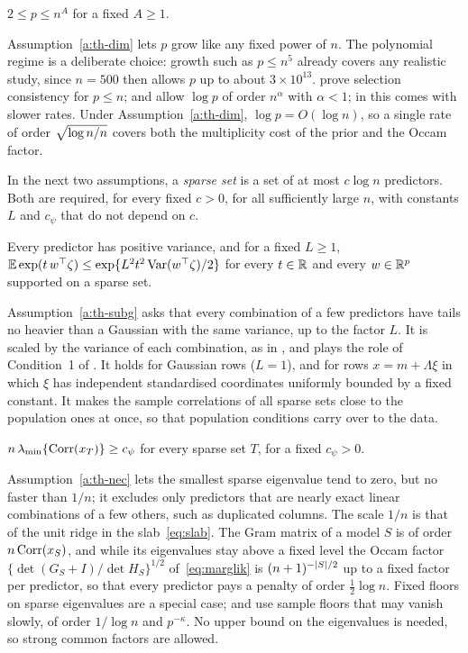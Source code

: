 \begin{assumption}[Dimension]\label{a:th-dim}
$2\le p\le n^A$ for a fixed $A\ge1$.
\end{assumption}

Assumption~\ref{a:th-dim} lets $p$ grow like any fixed power of $n$. The polynomial regime is a deliberate choice:
growth such as $p\le n^5$ already covers any realistic study, since $n=500$ then allows $p$ up to about $3\times10^{13}$.
\citet{JohnsonRossell2012} prove selection
consistency for $p\le n$; \citet{SongLiang2015} and \citet{ShinBhattacharyaJohnson2018} allow $\log p$ of order
$n^\alpha$ with $\alpha<1$; in \citet{SongLiang2015} this comes with slower rates. Under Assumption~\ref{a:th-dim}, $\log p=O(\log n)$, so a
single rate of order $\sqrt{\log n/n}$ covers both the multiplicity cost of the prior and the Occam factor.

In the next two assumptions, a \emph{sparse set} is a set of at most $c\log n$ predictors. Both are required, for
every fixed $c>0$, for all sufficiently large $n$, with constants $L$ and $c_\psi$ that do not depend on $c$.

\begin{assumption}\label{a:th-subg}
Every predictor has positive variance, and for a fixed $L\ge1$,
$\operatorname{\mathbb{E}}\exp(t\,w^\top\zeta)\le\exp\{L^2t^2\operatorname{Var}(w^\top\zeta)/2\}$ for every $t\in\mathbb{R}$ and every $w\in\mathbb{R}^p$ supported on a
sparse set.
\end{assumption}

Assumption~\ref{a:th-subg} asks that every combination of a few predictors have tails no heavier than a Gaussian with
the same variance, up to the factor $L$. It is scaled by the variance of each combination, as in
\citet{RudelsonZhou2013}, and plays the role of Condition~1 of \citet{SongLiang2015}. It holds for Gaussian rows
($L=1$), and for rows $x=m+\Lambda\xi$ in which $\xi$ has independent standardised coordinates uniformly bounded by a
fixed constant. It makes the sample correlations of all sparse sets close to the population ones at once, so that
population conditions carry over to the data.

\begin{assumption}\label{a:th-nec}
$n\,\lambda_{\min}\{\operatorname{Corr}(x_T)\}\ge c_\psi$ for every sparse set $T$, for a fixed $c_\psi>0$.
\end{assumption}

Assumption~\ref{a:th-nec} lets the smallest sparse eigenvalue tend to zero, but no faster than $1/n$; it excludes only
predictors that are nearly exact linear combinations of a few others, such as duplicated columns. The scale $1/n$ is
that of the unit ridge in the slab~\eqref{eq:slab}. The Gram matrix of a model $S$ is of order $n\operatorname{Corr}(x_S)$, and while
its eigenvalues stay above a fixed level the Occam factor $\{\det(G_S+I)/\det H_S\}^{1/2}$ of~\eqref{eq:marglik} is
$(n+1)^{-\lvert S\rvert/2}$ up to a fixed factor per predictor, so that every predictor pays a penalty of order $\tfrac12\log
n$. Fixed floors on sparse eigenvalues are a special case; \citet{BickelRitovTsybakov2009} and \citet{NarisettyHe2014}
use sample floors that may vanish slowly, of order $1/\log n$ and $p^{-\kappa}$. No upper
bound on the eigenvalues is needed, so strong common factors are allowed.

